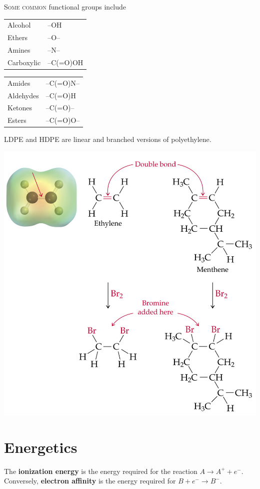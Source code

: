 \documentclass{tufte-book}
\renewcommand{\emph}[1]{\textbf{#1}}
\begin{document}
\textsc{Some common} functional groups include
%
\begin{center}
  \begin{tabular}{ll}
    Alcohol & --OH \\
    Ethers & --O-- \\
    Amines & --N-- \\
    Carboxylic & --C(=O)OH
  \end{tabular} \qquad\qquad
  \begin{tabular}{ll}
    Amides & --C(=O)N-- \\
    Aldehydes & --C(=O)H \\
    Ketones & --C(=O)-- \\
    Esters & --C(=O)O--
  \end{tabular}
\end{center}
%
LDPE and HDPE are linear and branched versions of polyethylene.
%
\begin{marginfigure}[0mm]
\begin{center}
  \includegraphics[width=\textwidth]{organic}
\end{center}
\end{marginfigure}

\section{Energetics}
The \emph{ionization energy} is the energy required for the reaction $A \to A^+ + e^-$. Conversely, \emph{electron affinity} is the energy required for $B + e^- \to B^-$.
\end{document}
